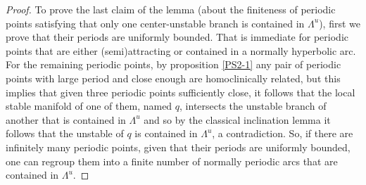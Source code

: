\documentclass[a4paper,11pt]{article}
\theoremstyle{definition}
\def\La{\Lambda}
\def\de{\delta}
\def\La{\Lambda}
\begin{document}
\begin{proof}


To prove the last claim of the lemma (about the finiteness of periodic points satisfying that  only one center-unstable branch is contained in $\La^u$),  first we prove that their periods are uniformly bounded. That is immediate for  periodic points that are either   (semi)attracting or contained in a normally hyperbolic arc. For the remaining periodic points, by proposition \ref{PS2-1}   any  pair of periodic points with large period and close enough are homoclinically related, but this implies that given three periodic points sufficiently close, it follows that the local stable manifold of  one  of them, named $q$, intersects the unstable branch of another that is contained in $\La^u$ and so by the classical inclination lemma it follows that the unstable of $q$ is contained in $\La^u$, a contradiction.  
So, if there are infinitely many periodic points, given that their periods are uniformly bounded, one can regroup them into a finite number of normally periodic arcs that are contained in $\La^u.$
\end{proof}
\end{document}
